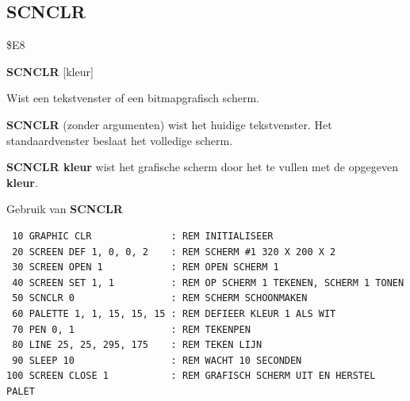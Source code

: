 
\newpage
\subsection{SCNCLR}
\begin{description}[leftmargin=2cm,style=nextline]
\item [Token:]    \$E8

\item [Formaat:]   {\bf SCNCLR} [kleur]

\item [Gebruik:]    Wist een tekstvenster of een bitmapgrafisch scherm.

                  {\bf SCNCLR} (zonder argumenten) wist het huidige tekstvenster. Het standaardvenster beslaat het volledige scherm.

                  {\bf SCNCLR kleur} wist het grafische scherm door het te vullen met de opgegeven {\bf kleur}.

\item [Voorbeeld:]  Gebruik van {\bf SCNCLR}

\begin{tcolorbox}[colback=black,coltext=white]
\verbatimfont{\codefont}
\begin{verbatim}
 10 GRAPHIC CLR              : REM INITIALISEER
 20 SCREEN DEF 1, 0, 0, 2    : REM SCHERM #1 320 X 200 X 2
 30 SCREEN OPEN 1            : REM OPEN SCHERM 1
 40 SCREEN SET 1, 1          : REM OP SCHERM 1 TEKENEN, SCHERM 1 TONEN
 50 SCNCLR 0                 : REM SCHERM SCHOONMAKEN
 60 PALETTE 1, 1, 15, 15, 15 : REM DEFIEER KLEUR 1 ALS WIT
 70 PEN 0, 1                 : REM TEKENPEN
 80 LINE 25, 25, 295, 175    : REM TEKEN LIJN
 90 SLEEP 10                 : REM WACHT 10 SECONDEN
100 SCREEN CLOSE 1           : REM GRAFISCH SCHERM UIT EN HERSTEL PALET
\end{verbatim}
\end{tcolorbox}
\end{description}


\newpage
